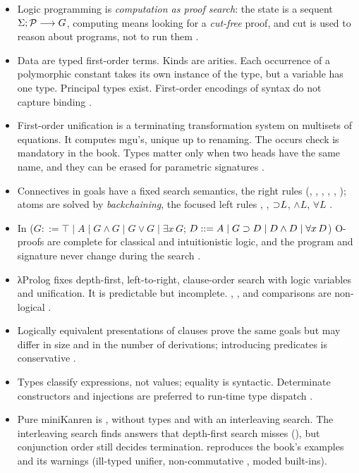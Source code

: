 \begin{itemize}
  \item Logic programming is \emph{computation as proof search}: the state is a sequent
    $\Sigma;\mathcal{P}\longrightarrow G$, computing means looking for a \emph{cut-free} proof, and cut is used to reason
    about programs, not to run them .
  \item Data are typed first-order terms. Kinds are arities. Each occurrence of a polymorphic constant
    takes its own instance of the type, but a variable has one type. Principal types exist. First-order
    encodings of syntax do not capture binding .
  \item First-order unification is a terminating transformation system on multisets of equations. It computes
    mgu's, unique up to renaming. The occurs check is mandatory in the book. Types matter only when two
    heads have the same name, and they can be erased for parametric signatures .
  \item Connectives in goals have a fixed search semantics, the right rules (, ,
    , , , ); atoms are solved by
    \emph{backchaining}, the focused left rules , , ${\supset}L$, $\wedge L$,
    $\forall L$ .
  \item In \fohc{} ($G ::= \top\mid A\mid G\wedge G\mid G\vee G\mid\exists x\,G$; $D ::= A\mid G\supset D\mid D\wedge
    D\mid\forall x\,D$) O-proofs are complete for classical and intuitionistic logic, and the program and
    signature never change during the search .
  \item λProlog fixes depth-first, left-to-right, clause-order search with logic variables and
    unification. It is predictable but incomplete. \lp{!}, ,  and comparisons are
    non-logical .
  \item Logically equivalent presentations of clauses prove the same goals but may differ in size and in the
    number of derivations; introducing predicates is conservative .
  \item Types classify expressions, not values; equality is syntactic. Determinate constructors and
    injections are preferred to run-time type dispatch .
  \item Pure miniKanren is \fohc{}, without types and with an interleaving search. The interleaving search
    finds answers that depth-first search misses (), but conjunction order still decides
    termination. \micro{} reproduces the book's examples and its warnings (ill-typed unifier,
    non-commutative , moded built-ins).
\end{itemize}
